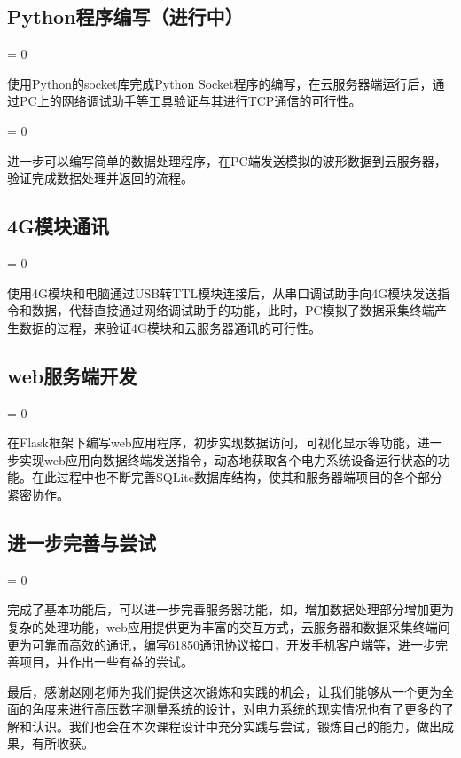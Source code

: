 \documentclass[a4paper,11pt]{ctexart}
\newcommand{\subpar}
{
	\par
	\hangafter = 0
	\setlength{\hangindent}{1em}
}
\begin{document}
\begin{spacing}{1.5}
\subsection{Python程序编写（进行中）}
\subpar
使用Python的socket库完成Python Socket程序的编写，在云服务器端运行后，通过PC上的网络调试助手等工具验证与其进行TCP通信的可行性。
\subpar
进一步可以编写简单的数据处理程序，在PC端发送模拟的波形数据到云服务器，验证完成数据处理并返回的流程。

\subsection{4G模块通讯}
\subpar
使用4G模块和电脑通过USB转TTL模块连接后，从串口调试助手向4G模块发送指令和数据，代替直接通过网络调试助手的功能，此时，PC模拟了数据采集终端产生数据的过程，来验证4G模块和云服务器通讯的可行性。

\subsection{web服务端开发}
\subpar
在Flask框架下编写web应用程序，初步实现数据访问，可视化显示等功能，进一步实现web应用向数据终端发送指令，动态地获取各个电力系统设备运行状态的功能。在此过程中也不断完善SQLite数据库结构，使其和服务器端项目的各个部分紧密协作。

\subsection{进一步完善与尝试}
\subpar
完成了基本功能后，可以进一步完善服务器功能，如，增加数据处理部分增加更为复杂的处理功能，web应用提供更为丰富的交互方式，云服务器和数据采集终端间更为可靠而高效的通讯，编写61850通讯协议接口，开发手机客户端等，进一步完善项目，并作出一些有益的尝试。

\newpage
\par
最后，感谢赵刚老师为我们提供这次锻炼和实践的机会，让我们能够从一个更为全面的角度来进行高压数字测量系统的设计，对电力系统的现实情况也有了更多的了解和认识。我们也会在本次课程设计中充分实践与尝试，锻炼自己的能力，做出成果，有所收获。

\end{spacing}
	
\end{document}

